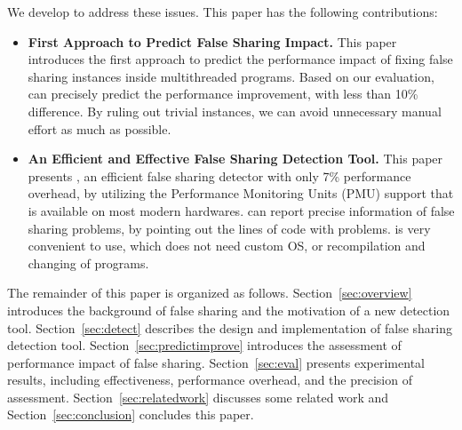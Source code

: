 \vspace{0.2in}


We develop \cheetah{} to address these issues. This paper has the following contributions:

\begin{itemize} 

\item {\bf First Approach to Predict False Sharing Impact.} This paper introduces the first approach to predict the performance impact of fixing false sharing instances inside multithreaded programs. Based on our evaluation, \cheetah{} can precisely predict the performance improvement, with less than 10\% difference. By ruling out trivial instances, we can avoid unnecessary manual effort as much as possible. 

\item {\bf An Efficient and Effective False Sharing Detection Tool.} This paper presents \cheetah{}, an efficient false sharing detector with only 7\% performance overhead, by utilizing the Performance Monitoring Units (PMU) support that is available on most modern hardwares. \cheetah{} can report precise information of false sharing problems, by pointing out the lines of code with problems.  \cheetah{} is very convenient to use, which does not need custom OS,  or recompilation and changing of programs. 

\end{itemize}

The remainder of this paper is organized as follows. Section~\ref{sec:overview} introduces the background of false sharing and the motivation of a new detection tool. Section~\ref{sec:detect} describes the design and implementation of false sharing detection tool. Section~\ref{sec:predictimprove} introduces the assessment of performance impact of false sharing. Section~\ref{sec:eval} presents experimental results, including effectiveness, performance overhead, and the precision of assessment. Section~\ref{sec:relatedwork} discusses some related work and Section~\ref{sec:conclusion} concludes this paper. 



